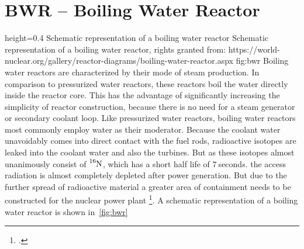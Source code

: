 \section{BWR – Boiling Water Reactor}
    {height=0.4\textheight}
    {Schematic representation of a boiling water reactor}
    {Schematic representation of a boiling water reactor, rights granted from: https://world-nuclear.org/gallery/reactor-diagrams/boiling-water-reactor.aspx}
    {fig:bwr}
Boiling water reactors are characterized by their mode of steam production. In comparison to pressurized
water reactors, these reactors boil the water directly inside the reactor core. This has the advantage
of significantly increasing the simplicity of reactor construction, because there is no need for a steam
generator or secondary coolant loop. Like pressurized water reactors, boiling water reactors most commonly
employ water as their moderator. Because the coolant water unavoidably comes into direct contact with
the fuel rods, radioactive isotopes are leaked into the coolant water and also the turbines. But 
as these isotopes almost unanimously consist of $\ce{^{16}N}$, which has a short half life of $7~$seconds.
the access radiation is almost completely depleted after power generation. But due to the further
spread of radioactive material a greater area of containment needs to be constructed for the nuclear
power plant \footcite[85-140]{engHandbook}. A schematic representation of a boiling water reactor
is shown in~\ref{fig:bwr}
\pagebreak
